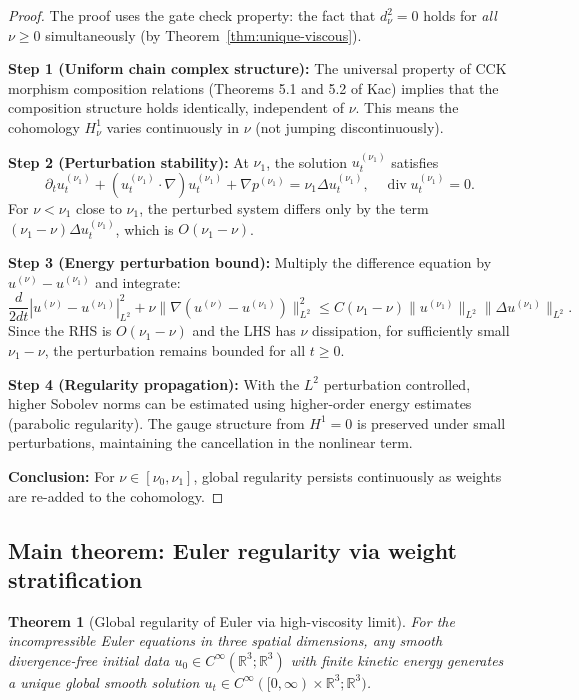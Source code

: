 \documentclass[reqno,10pt]{amsart}
\theoremstyle{plain}
\newtheorem{theorem}{Theorem}[section]
\theoremstyle{definition}
\def\div{\operatorname{div}}
\begin{document}
\begin{proof}
The proof uses the gate check property: the fact that $d_\nu^2 = 0$ holds for \emph{all} $\nu \geq 0$ simultaneously (by Theorem~\ref{thm:unique-viscous}).

\textbf{Step 1 (Uniform chain complex structure):} The universal property of CCK morphism composition relations (Theorems 5.1 and 5.2 of Kac) implies that the composition structure holds identically, independent of $\nu$. This means the cohomology $H^1_\nu$ varies continuously in $\nu$ (not jumping discontinuously).

\textbf{Step 2 (Perturbation stability):} At $\nu_1$, the solution $u_t^{(\nu_1)}$ satisfies
\[
  \partial_t u_t^{(\nu_1)} + (u_t^{(\nu_1)}\cdot\nabla)u_t^{(\nu_1)} + \nabla p^{(\nu_1)} = \nu_1 \Delta u_t^{(\nu_1)}, \quad \div u_t^{(\nu_1)}=0.
\]
For $\nu < \nu_1$ close to $\nu_1$, the perturbed system differs only by the term $(\nu_1-\nu)\Delta u_t^{(\nu_1)}$, which is $O(\nu_1-\nu)$.

\textbf{Step 3 (Energy perturbation bound):} Multiply the difference equation by $u^{(\nu)} - u^{(\nu_1)}$ and integrate:
\[
  \frac{d}{2dt}|u^{(\nu)} - u^{(\nu_1)}|_{L^2}^2 + \nu \|\nabla(u^{(\nu)} - u^{(\nu_1)})\|_{L^2}^2
  \le C(\nu_1-\nu)\|u^{(\nu_1)}\|_{L^2}\|\Delta u^{(\nu_1)}\|_{L^2}.
\]
Since the RHS is $O(\nu_1-\nu)$ and the LHS has $\nu$ dissipation, for sufficiently small $\nu_1-\nu$, the perturbation remains bounded for all $t \geq 0$.

\textbf{Step 4 (Regularity propagation):} With the $L^2$ perturbation controlled, higher Sobolev norms can be estimated using higher-order energy estimates (parabolic regularity). The gauge structure from $H^1=0$ is preserved under small perturbations, maintaining the cancellation in the nonlinear term.

\textbf{Conclusion:} For $\nu \in [\nu_0, \nu_1]$, global regularity persists continuously as weights are re-added to the cohomology.
\end{proof}

\subsection{Main theorem: Euler regularity via weight stratification}

\begin{theorem}[Global regularity of Euler via high-viscosity limit]\label{thm:euler-regularity}
For the incompressible Euler equations in three spatial dimensions, any smooth divergence-free initial data $u_0 \in C^\infty(\mathbb{R}^3;\mathbb{R}^3)$ with finite kinetic energy generates a unique global smooth solution $u_t \in C^\infty([0,\infty)\times\mathbb{R}^3;\mathbb{R}^3)$.
\end{theorem}
\end{document}
